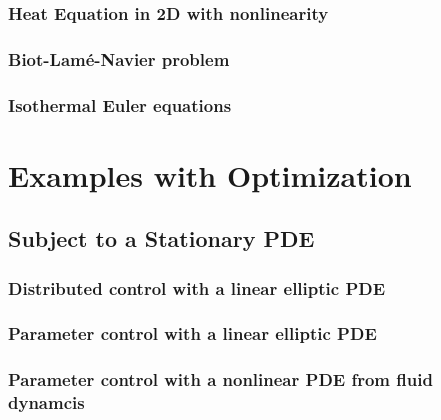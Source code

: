 \documentclass[a4paper,cleardoubleempty]{scrreprt}
\theoremstyle{plain}
\theoremstyle{remark}
\begin{document}
\subsection{Heat Equation in 2D with nonlinearity}
\label{PDE_Instat_Heat_2D}

\clearpage
\subsection{Biot-Lam\'e-Navier problem}
\label{PDE_Instat_biot_lame_navier}

\cleardoublepage
\subsection{Isothermal Euler equations}
\label{PDE_isothermal_euler}

\cleardoublepage
\chapter{Examples with Optimization}
\label{OPT}
\section{Subject to a Stationary PDE}
\label{OPT_Stat}
\subsection{Distributed control with a linear elliptic PDE}
\label{OPT_Stat_Distrib_Lin_Ellipt}

\clearpage
\subsection{Parameter control with a linear elliptic PDE}
\label{OPT_Stat_Param_Lin_Ellipt}

\clearpage
\subsection{Parameter control with a nonlinear PDE from fluid dynamcis}
\label{OPT_Stat_Param_Nonlin_Fluid}

\clearpage
\end{document}
